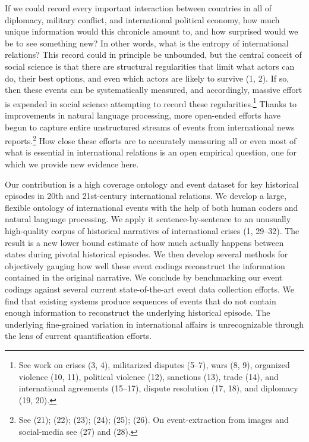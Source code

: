 \documentclass{article}
\begin{document}
If we could record every important interaction between countries in all
of diplomacy, military conflict, and international political economy,
how much unique information would this chronicle amount to, and how
surprised would we be to see something new? In other words, what is the
entropy of international relations? This record could in principle be
unbounded, but the central conceit of social science is that there are
structural regularities that limit what actors can do, their best
options, and even which actors are likely to survive (1, 2). If so, then
these events can be systematically measured, and accordingly, massive
effort is expended in social science attempting to record these
regularities.\footnote{See work on crises (3, 4), militarized disputes
  (5--7), wars (8, 9), organized violence (10, 11), political violence
  (12), sanctions (13), trade (14), and international agreements
  (15--17), dispute resolution (17, 18), and diplomacy (19, 20).} Thanks
to improvements in natural language processing, more open-ended efforts
have begun to capture entire unstructured streams of events from
international news reports.\footnote{See (21); (22); (23); (24); (25);
  (26). On event-extraction from images and social-media see (27) and
  (28).} How close these efforts are to accurately measuring all or even
most of what is essential in international relations is an open
empirical question, one for which we provide new evidence here.

Our contribution is a high coverage ontology and event dataset for key
historical episodes in 20th and 21st-century international relations. We
develop a large, flexible ontology of international events with the help
of both human coders and natural language processing. We apply it
sentence-by-sentence to an unusually high-quality corpus of historical
narratives of international crises (1, 29--32). The result is a new
lower bound estimate of how much actually happens between states during
pivotal historical episodes. We then develop several methods for
objectively gauging how well these event codings reconstruct the
information contained in the original narrative. We conclude by
benchmarking our event codings against several current state-of-the-art
event data collection efforts. We find that existing systems produce
sequences of events that do not contain enough information to
reconstruct the underlying historical episode. The underlying
fine-grained variation in international affairs is unrecognizable
through the lens of current quantification efforts.
\end{document}
